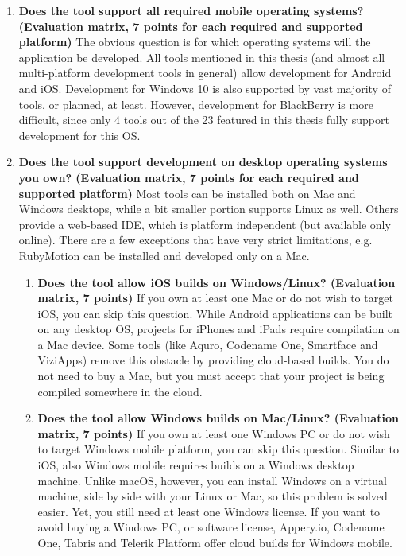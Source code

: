 \documentclass[english,master,public,dept460,male,cpdeclaration,oneside]{diploma}
\begin{document}
\begin{enumerate}
	\item \textbf{Does the tool support all required mobile operating systems? (Evaluation matrix, 7 points for each required and supported platform)}
	The obvious question is for which operating systems will the application be developed. All tools mentioned in this thesis (and almost all multi-platform development tools in general) allow development for Android and iOS. Development for Windows 10 is also supported by vast majority of tools, or planned, at least. However, development for BlackBerry is more difficult, since only 4 tools out of the 23 featured in this thesis fully support development for this OS.
	
	\item \textbf{Does the tool support development on desktop operating systems you own? (Evaluation matrix, 7 points for each required and supported platform)}
	Most tools can be installed both on Mac and Windows desktops, while a bit smaller portion supports Linux as well. Others provide a web-based IDE, which is platform independent (but available only online). There are a few exceptions that have very strict limitations, e.g. RubyMotion can be installed and developed only on a Mac. 
	
	\begin{enumerate}
		\item \textbf{Does the tool allow iOS builds on Windows/Linux? (Evaluation matrix, 7 points) }
		If you own at least one Mac or do not wish to target iOS, you can skip this question. While Android applications can be built on any desktop OS, projects for iPhones and iPads require compilation on a Mac device. Some tools (like Aquro, Codename One, Smartface and ViziApps) remove this obstacle by providing cloud-based builds. You do not need to buy a Mac, but you must accept that your project is being compiled somewhere in the cloud.
		
		\item \textbf{Does the tool allow Windows builds on Mac/Linux? (Evaluation matrix, 7 points) }
		If you own at least one Windows PC or do not wish to target Windows mobile platform, you can skip this question. Similar to iOS, also Windows mobile requires builds on a Windows desktop machine. Unlike macOS, however, you can install Windows on a virtual machine, side by side with your Linux or Mac, so this problem is solved easier. Yet, you still need at least one Windows license. If you want to avoid buying a Windows PC, or software license, Appery.io, Codename One, Tabris and Telerik Platform offer cloud builds for Windows mobile.
	\end{enumerate}
	

\end{enumerate}
\end{document}
